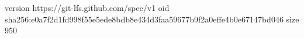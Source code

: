 version https://git-lfs.github.com/spec/v1
oid sha256:e0a7f2d1fd998f55e5ede8bdb8e434d3faa59677b9f2a0effe4b0e67147bd046
size 950

